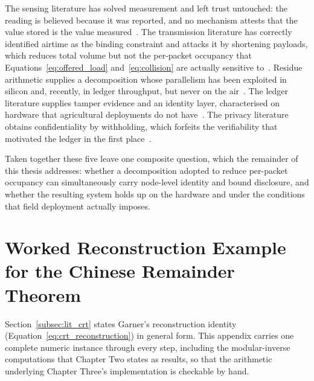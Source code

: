 \documentclass[12pt,a4paper,oneside]{book}
\begin{document}
The sensing literature has solved measurement and left trust untouched: the
reading is believed because it was reported, and no mechanism attests that the
value stored is the value measured~\cite{soussi2024smartsensors,
aydin2021comprehensive}. The transmission literature has correctly identified
airtime as the binding constraint and attacks it by shortening payloads, which
reduces total volume but not the per-packet occupancy that
Equations~\ref{eq:offered_load} and~\ref{eq:collision} are actually sensitive
to~\cite{marcelloni2009energy, chen2025compression}. Residue arithmetic
supplies a decomposition whose parallelism has been exploited in silicon and,
recently, in ledger throughput, but never on the
air~\cite{parhami2010computer, luo2023researchapplication,
maiwada2025blockchainscalability}. The ledger literature supplies tamper
evidence and an identity layer, characterised on hardware that agricultural
deployments do not have~\cite{tar2023fabric,
zulkarnain2025performancebenchmarking}. The privacy literature obtains
confidentiality by withholding, which forfeits the verifiability that motivated
the ledger in the first place~\cite{kormiltsyn2023privacyconflict,
yousif2026enablingprivacy}.

Taken together these five leave one composite question, which the remainder of
this thesis addresses: whether a decomposition adopted to reduce per-packet
occupancy can simultaneously carry node-level identity and bound disclosure,
and whether the resulting system holds up on the hardware and under the
conditions that field deployment actually imposes.
\clearpage{}


\backmatter

\begin{singlespace}
\printbibliography[heading=none]
\end{singlespace}

\appendix
\renewcommand{\thechapterword}{\thechapter}
\makeatletter\global\@mainmattertrue\makeatother
\clearpage{}

\chapter{Worked Reconstruction Example for the Chinese Remainder Theorem}
\label{app:crt_worked}

Section~\ref{subsec:lit_crt} states Garner's reconstruction identity
(Equation~\ref{eq:crt_reconstruction}) in general form. This appendix
carries one complete numeric instance through every step, including the
modular-inverse computations that Chapter Two states as results, so that
the arithmetic underlying Chapter Three's implementation is checkable by
hand.
\end{document}
